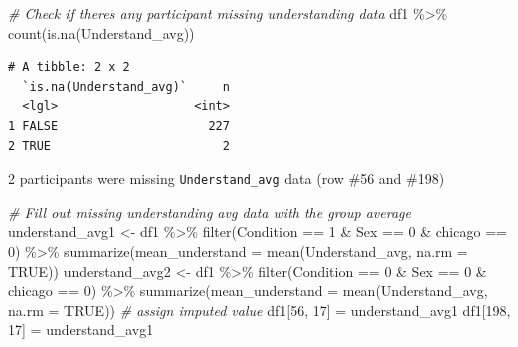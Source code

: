 \documentclass[
  letterpaper,
  DIV=11,
  numbers=noendperiod]{scrartcl}
\newenvironment{Shaded}{\begin{snugshade}}{\end{snugshade}}
\newcommand{\AttributeTok}[1]{\textcolor[rgb]{0.49,0.56,0.16}{#1}}
\newcommand{\CommentTok}[1]{\textcolor[rgb]{0.38,0.63,0.69}{\textit{#1}}}
\newcommand{\ConstantTok}[1]{\textcolor[rgb]{0.53,0.00,0.00}{#1}}
\newcommand{\DecValTok}[1]{\textcolor[rgb]{0.25,0.63,0.44}{#1}}
\newcommand{\FunctionTok}[1]{\textcolor[rgb]{0.02,0.16,0.49}{#1}}
\newcommand{\NormalTok}[1]{\textcolor[rgb]{0.00,0.44,0.13}{#1}}
\newcommand{\OtherTok}[1]{\textcolor[rgb]{0.00,0.44,0.13}{#1}}
\newcommand{\SpecialCharTok}[1]{\textcolor[rgb]{0.25,0.44,0.63}{#1}}
\begin{document}
\begin{Shaded}
\begin{Highlighting}[]
\CommentTok{\# Check if there\textquotesingle{}s any participant missing understanding data}
\NormalTok{df1 }\SpecialCharTok{\%\textgreater{}\%} \FunctionTok{count}\NormalTok{(}\FunctionTok{is.na}\NormalTok{(Understand\_avg))}
\end{Highlighting}
\end{Shaded}

\begin{verbatim}
# A tibble: 2 x 2
  `is.na(Understand_avg)`     n
  <lgl>                   <int>
1 FALSE                     227
2 TRUE                        2
\end{verbatim}

2 participants were missing \texttt{Understand\_avg} data (row \#56 and
\#198)

\begin{Shaded}
\begin{Highlighting}[]
\CommentTok{\# Fill out missing understanding avg data with the group average}
\NormalTok{understand\_avg1 }\OtherTok{\textless{}{-}}\NormalTok{ df1 }\SpecialCharTok{\%\textgreater{}\%} \FunctionTok{filter}\NormalTok{(Condition }\SpecialCharTok{==} \DecValTok{1} \SpecialCharTok{\&}\NormalTok{ Sex }\SpecialCharTok{==} \DecValTok{0} \SpecialCharTok{\&}\NormalTok{ chicago }\SpecialCharTok{==} \DecValTok{0}\NormalTok{) }\SpecialCharTok{\%\textgreater{}\%} \FunctionTok{summarize}\NormalTok{(}\AttributeTok{mean\_understand =} \FunctionTok{mean}\NormalTok{(Understand\_avg, }\AttributeTok{na.rm =} \ConstantTok{TRUE}\NormalTok{))}
\NormalTok{understand\_avg2 }\OtherTok{\textless{}{-}}\NormalTok{ df1 }\SpecialCharTok{\%\textgreater{}\%} \FunctionTok{filter}\NormalTok{(Condition }\SpecialCharTok{==} \DecValTok{0} \SpecialCharTok{\&}\NormalTok{ Sex }\SpecialCharTok{==} \DecValTok{0} \SpecialCharTok{\&}\NormalTok{ chicago }\SpecialCharTok{==} \DecValTok{0}\NormalTok{) }\SpecialCharTok{\%\textgreater{}\%} \FunctionTok{summarize}\NormalTok{(}\AttributeTok{mean\_understand =} \FunctionTok{mean}\NormalTok{(Understand\_avg, }\AttributeTok{na.rm =} \ConstantTok{TRUE}\NormalTok{))}
\CommentTok{\# assign imputed value}
\NormalTok{df1[}\DecValTok{56}\NormalTok{, }\DecValTok{17}\NormalTok{] }\OtherTok{=}\NormalTok{ understand\_avg1}
\NormalTok{df1[}\DecValTok{198}\NormalTok{, }\DecValTok{17}\NormalTok{] }\OtherTok{=}\NormalTok{ understand\_avg1}
\end{Highlighting}
\end{Shaded}
\end{document}
